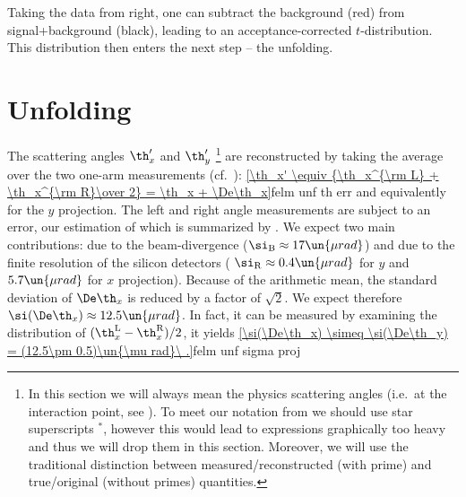 
Taking the data from  right, one can subtract the background (red) from signal+background (black), leading to an acceptance-corrected $t$-distribution. This distribution then enters the next step -- the unfolding.


\section[felm unfold]{Unfolding}

The scattering angles $\th_x'$ and $\th_y'$ \footnote{
In this section we will always mean the physics scattering angles (i.e.~at the interaction point, see ). To meet our notation from  we should use star superscripts $^*$, however this would lead to expressions graphically too heavy and thus we will drop them in this section. Moreover, we will use the traditional distinction between measured/reconstructed (with prime) and true/original (without primes) quantities.
} are reconstructed by taking the average over the two one-arm measurements (cf.~):
\eqref{\th_x' \equiv {\th_x^{\rm L} + \th_x^{\rm R}\over 2} = \th_x + \De\th_x}{felm unf th err}
and equivalently for the $y$ projection. The left and right angle measurements are subject to an error, our estimation of which is summarized by . We expect two main contributions: due to the beam-divergence ($\si_{\rm B} \approx 17\un{\mu rad}$) and due to the finite resolution of the silicon detectors (
$\si_{\rm R} \approx 0.4\un{\mu rad}$ for $y$ and $5.7\un{\mu rad}$ for $x$ projection). Because of the arithmetic mean, the standard deviation of $\De\th_x$ is reduced by a factor of $\sqrt 2$. We expect therefore $\si(\De\th_x) \approx 12.5\un{\mu rad}$. In fact, it can be measured by examining the distribution of $(\th_x^{\rm L} - \th_x^{\rm R})/2$, it yields
\eqref{\si(\De\th_x) \simeq \si(\De\th_y) = (12.5\pm 0.5)\un{\mu rad}\ .}{felm unf sigma proj}

